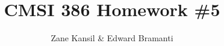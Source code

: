 \documentclass{article}
\title{CMSI 386 Homework \#5}
\author{Zane Kansil \& Edward Bramanti}
\begin{document}
\maketitle
\begin{enumerate}



\end{enumerate}
\end{document}
